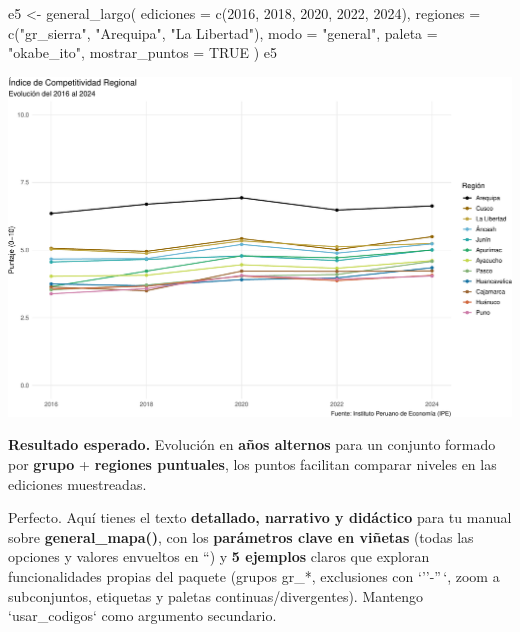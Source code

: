 \documentclass[
  11pt,
  letterpaper,
  DIV=11,
  numbers=noendperiod]{scrartcl}
\newenvironment{Shaded}{\begin{snugshade}}{\end{snugshade}}
\newcommand{\AttributeTok}[1]{\textcolor[rgb]{0.40,0.45,0.13}{#1}}
\newcommand{\ConstantTok}[1]{\textcolor[rgb]{0.56,0.35,0.01}{#1}}
\newcommand{\DecValTok}[1]{\textcolor[rgb]{0.68,0.00,0.00}{#1}}
\newcommand{\FunctionTok}[1]{\textcolor[rgb]{0.28,0.35,0.67}{#1}}
\newcommand{\NormalTok}[1]{\textcolor[rgb]{0.00,0.23,0.31}{#1}}
\newcommand{\OtherTok}[1]{\textcolor[rgb]{0.00,0.23,0.31}{#1}}
\newcommand{\StringTok}[1]{\textcolor[rgb]{0.13,0.47,0.30}{#1}}
\begin{document}
\begin{Shaded}
\begin{Highlighting}[]
\NormalTok{e5 }\OtherTok{\textless{}{-}} \FunctionTok{general\_largo}\NormalTok{(}
  \AttributeTok{ediciones =} \FunctionTok{c}\NormalTok{(}\DecValTok{2016}\NormalTok{, }\DecValTok{2018}\NormalTok{, }\DecValTok{2020}\NormalTok{, }\DecValTok{2022}\NormalTok{, }\DecValTok{2024}\NormalTok{),}
  \AttributeTok{regiones  =} \FunctionTok{c}\NormalTok{(}\StringTok{"gr\_sierra"}\NormalTok{, }\StringTok{"Arequipa"}\NormalTok{, }\StringTok{"La Libertad"}\NormalTok{),}
  \AttributeTok{modo      =} \StringTok{"general"}\NormalTok{,}
  \AttributeTok{paleta    =} \StringTok{"okabe\_ito"}\NormalTok{,}
  \AttributeTok{mostrar\_puntos =} \ConstantTok{TRUE}
\NormalTok{)}
\NormalTok{e5}
\end{Highlighting}
\end{Shaded}

\includegraphics{Manual_files/figure-pdf/unnamed-chunk-40-1.pdf}

\textbf{Resultado esperado.} Evolución en \textbf{años alternos} para un
conjunto formado por \textbf{grupo} + \textbf{regiones puntuales}, los
puntos facilitan comparar niveles en las ediciones muestreadas.

Perfecto. Aquí tienes el texto \textbf{detallado, narrativo y didáctico}
para tu manual sobre \textbf{general\_mapa()}, con los
\textbf{parámetros clave en viñetas} (todas las opciones y valores
envueltos en ``) y \textbf{5 ejemplos} claros que exploran
funcionalidades propias del paquete (grupos gr\_*, exclusiones con
`''-''\,`, zoom a subconjuntos, etiquetas y paletas
continuas/divergentes). Mantengo `usar\_codigos` como argumento
secundario.
\end{document}
